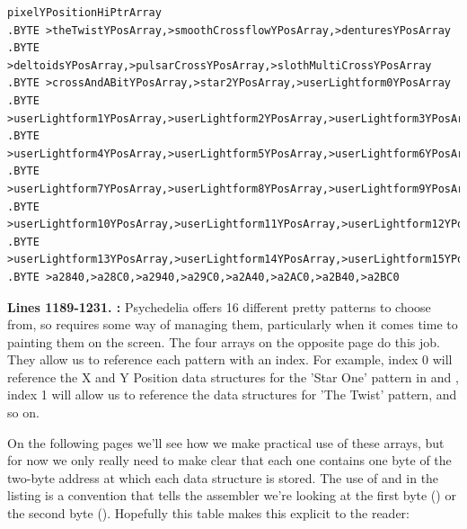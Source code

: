 \begin{lstlisting}
pixelYPositionHiPtrArray   
.BYTE >theTwistYPosArray,>smoothCrossflowYPosArray,>denturesYPosArray
.BYTE >deltoidsYPosArray,>pulsarCrossYPosArray,>slothMultiCrossYPosArray
.BYTE >crossAndABitYPosArray,>star2YPosArray,>userLightform0YPosArray
.BYTE >userLightform1YPosArray,>userLightform2YPosArray,>userLightform3YPosArray
.BYTE >userLightform4YPosArray,>userLightform5YPosArray,>userLightform6YPosArray
.BYTE >userLightform7YPosArray,>userLightform8YPosArray,>userLightform9YPosArray
.BYTE >userLightform10YPosArray,>userLightform11YPosArray,>userLightform12YPosArray
.BYTE >userLightform13YPosArray,>userLightform14YPosArray,>userLightform15YPosArray
.BYTE >a2840,>a28C0,>a2940,>a29C0,>a2A40,>a2AC0,>a2B40,>a2BC0
\end{lstlisting}
\clearpage

\textbf{Lines 1189-1231. :} Psychedelia
offers 16 different pretty patterns to choose from, so requires some way of managing them, particularly
when it comes time to painting them on the screen. The four arrays on the opposite page do this job.
They allow us to reference each pattern with an index. For example, index 0 will reference the X and
Y Position data structures for the 'Star One' pattern in  and 
, index 1 will allow us to reference the data structures for 'The Twist' pattern,
and so on.

On the following pages we'll see how we make practical use of these arrays, but for now we only really
need to make clear that each one contains one byte of the two-byte address at which each
data structure is stored. The use of \icode{<} and \icode{>} in the listing is a convention that
tells the assembler we're looking at the first byte (\icode{>}) or the second byte (\icode{<}).
Hopefully this table makes this explicit to the reader:

